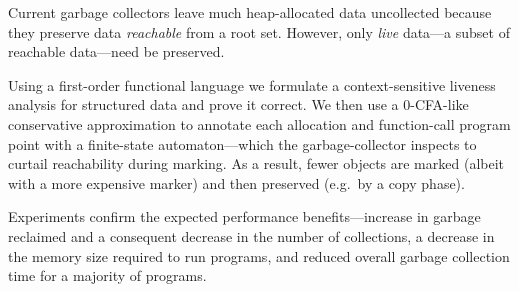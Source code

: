 Current garbage collectors  leave much heap-allocated data uncollected
because they preserve data {\em reachable} from a root set.
However, only  {\em live} data---a subset of  reachable data---need be
preserved.

Using   a    first-order   functional   language    we   formulate   a
context-sensitive liveness  analysis for structured data  and prove it
correct.   We  then use  a  0-CFA-like  conservative approximation  to
annotate  each  allocation  and  function-call program  point  with  a
finite-state  automaton---which   the  garbage-collector  inspects  to
curtail reachability  during marking. As  a result, fewer  objects are
marked  (albeit  with a  more  expensive  marker)  and then  preserved
(e.g.\ by a copy phase).

Experiments  confirm the  expected performance  benefits---increase in
garbage  reclaimed  and  a   consequent  decrease  in  the  number  of
collections, a decrease  in the memory size required  to run programs,
and  reduced  overall  garbage  collection  time  for  a  majority  of
programs.
